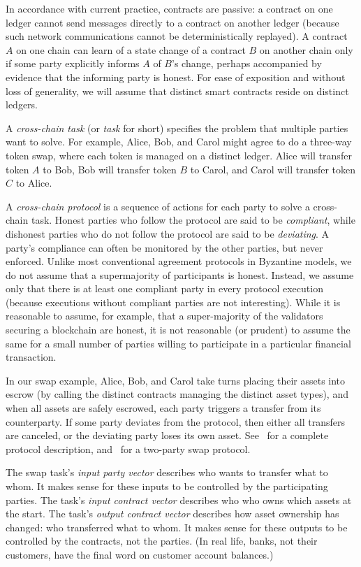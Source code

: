 In accordance with current practice,  contracts are passive:
a contract on one ledger cannot send messages directly to  a contract on another ledger
(because such network communications cannot be deterministically replayed). 
A contract $A$ on one chain can learn of a state change of
a contract $B$ on another chain only if some party explicitly
informs $A$ of $B$'s change,
perhaps accompanied by evidence that the informing party is honest.
For ease of exposition and without loss of generality,
we will assume that distinct smart contracts reside
on distinct ledgers.

A  \emph{cross-chain task} (or \emph{task} for short) specifies the problem that   multiple parties want to solve.
For example,
Alice, Bob, and Carol might agree to do a three-way token swap,
where each token is managed on a distinct ledger.
Alice will transfer token $A$ to Bob,
Bob will transfer token $B$ to Carol,
and Carol will transfer token $C$ to Alice.

A \emph{cross-chain protocol} is a sequence of actions for each party  to solve a cross-chain task.
Honest parties who follow the protocol are said to be \emph{compliant},
while dishonest parties who do not follow the protocol are said to be \emph{deviating}.
A party's compliance can often be monitored by the other parties,
but never enforced.
Unlike most conventional agreement protocols in Byzantine models,
we do not assume that a supermajority of participants is honest.
Instead,
we assume only that there is at least one compliant party in every protocol execution
(because
executions without compliant parties are not interesting).
While it is reasonable to assume, for example,
that a super-majority of the validators securing a blockchain are honest,
it is not reasonable (or prudent) to assume the same for a small number
of parties willing to participate in a particular financial transaction.

In our swap example,
Alice, Bob, and Carol take turns placing their assets into escrow
(by calling the distinct contracts managing the distinct asset types),
and when all assets are safely escrowed,
each party triggers a transfer from its counterparty. 
If some party deviates from the protocol,
then either all transfers are canceled,
or the deviating party loses its own asset.
See~\cite{Herlihy2018} for a complete protocol description,
and~ for a two-party swap protocol.

The swap task's \emph{input party vector} describes who wants to transfer what to whom.
It makes sense for these inputs to be controlled by the participating parties. 
The task's \emph{input contract vector} describes who who owns which assets at the start.
The task's \emph{output contract vector} describes how asset ownership has changed:
who transferred what to whom.
It makes sense for these outputs to be controlled by the  contracts,
not the parties.
(In real life, banks, not their customers,
have the final word on customer account balances.)

